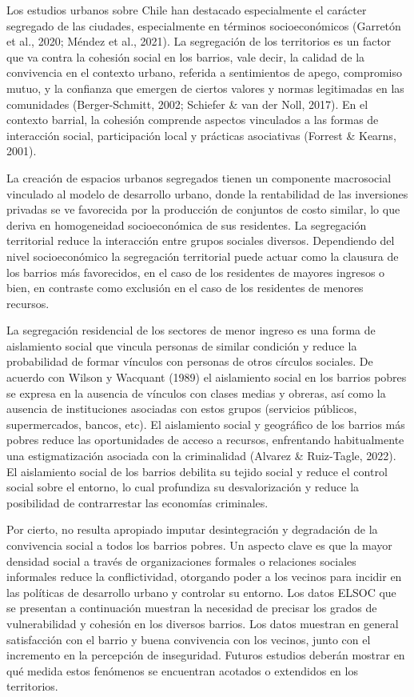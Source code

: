 \documentclass[
  12pt,
]{book}
\begin{document}
Los estudios urbanos sobre Chile han destacado especialmente el carácter segregado de las ciudades, especialmente en términos socioeconómicos (Garretón et al., 2020; Méndez et al., 2021). La segregación de los territorios es un factor que va contra la cohesión social en los barrios, vale decir, la calidad de la convivencia en el contexto urbano, referida a sentimientos de apego, compromiso mutuo, y la confianza que emergen de ciertos valores y normas legitimadas en las comunidades (Berger-Schmitt, 2002; Schiefer \& van der Noll, 2017). En el contexto barrial, la cohesión comprende aspectos vinculados a las formas de interacción social, participación local y prácticas asociativas (Forrest \& Kearns, 2001).

La creación de espacios urbanos segregados tienen un componente macrosocial vinculado al modelo de desarrollo urbano, donde la rentabilidad de las inversiones privadas se ve favorecida por la producción de conjuntos de costo similar, lo que deriva en homogeneidad socioeconómica de sus residentes. La segregación territorial reduce la interacción entre grupos sociales diversos. Dependiendo del nivel socioeconómico la segregación territorial puede actuar como la clausura de los barrios más favorecidos, en el caso de los residentes de mayores ingresos o bien, en contraste como exclusión en el caso de los residentes de menores recursos.

La segregación residencial de los sectores de menor ingreso es una forma de aislamiento social que vincula personas de similar condición y reduce la probabilidad de formar vínculos con personas de otros círculos sociales. De acuerdo con Wilson y Wacquant (1989) el aislamiento social en los barrios pobres se expresa en la ausencia de vínculos con clases medias y obreras, así como la ausencia de instituciones asociadas con estos grupos (servicios públicos, supermercados, bancos, etc). El aislamiento social y geográfico de los barrios más pobres reduce las oportunidades de acceso a recursos, enfrentando habitualmente una estigmatización asociada con la criminalidad (Alvarez \& Ruiz-Tagle, 2022). El aislamiento social de los barrios debilita su tejido social y reduce el control social sobre el entorno, lo cual profundiza su desvalorización y reduce la posibilidad de contrarrestar las economías criminales.

Por cierto, no resulta apropiado imputar desintegración y degradación de la convivencia social a todos los barrios pobres. Un aspecto clave es que la mayor densidad social a través de organizaciones formales o relaciones sociales informales reduce la conflictividad, otorgando poder a los vecinos para incidir en las políticas de desarrollo urbano y controlar su entorno. Los datos ELSOC que se presentan a continuación muestran la necesidad de precisar los grados de vulnerabilidad y cohesión en los diversos barrios. Los datos muestran en general satisfacción con el barrio y buena convivencia con los vecinos, junto con el incremento en la percepción de inseguridad. Futuros estudios deberán mostrar en qué medida estos fenómenos se encuentran acotados o extendidos en los territorios.
\end{document}
